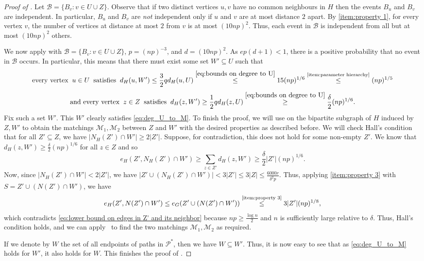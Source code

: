 \documentclass[10pt,a4paper,reqno]{amsart}
\begin{document}
\begin{proof}[Proof of ]
Let $\mathcal{B} = \{B_v : v \in U \cup Z\}$. Observe that if two distinct vertices $u,v$ have no common neighbours in $H$ then the events $B_u$ and $B_v$ are independent. In particular, $B_u$ and $B_v$ are \emph{not} independent only if $u$ and $v$ are at most distance $2$ apart. By \ref{item:property 1}, for every vertex $v$, the number of vertices at distance at most $2$ from $v$ is at most $(10np)^2$. Thus, each event in $\mathcal{B}$ is independent from all but at most $(10np)^2$ others. 

We now apply  with $\mathcal{B} = \{B_v : v \in U \cup Z\}$, $p = (np)^{-3}$, and $d = \left(10np\right)^2$. As $ep(d+1)<1$, there is a positive probability that no event in $\mathcal{B}$ occurs. In particular, this means that there must exist some set $W' \subseteq U$ such that 
\[
\text{every vertex} \;\; u \in U \;\; \text{satisfies} \;\; d_H(u,W') \le \frac{3}{2} q d_H(u,U) \overset{\eqref{eq:bounds on degree to U}}{\le} 15(np)^{1/6} \overset{\text{\ref{item:parameter hierarchy}}}{\le} (np)^{1/5}
\]
\[
\text{and every vertex} \;\; z \in Z \;\; \text{satisfies} \;\; d_H(z,W') \ge \frac{1}{2} q d_H(z,U) \overset{\eqref{eq:bounds on degree to U}}{\ge} \frac{\delta}{2}(np)^{1/6}.
\]
Fix such a set $W'$. This $W'$ clearly satisfies \ref{eq:deg_U_to_M}. To finish the proof, we will use  on the bipartite subgraph of $H$ induced by $Z,W'$ to obtain the matchings $\mathcal{M}_1, \mathcal{M}_2$ between $Z$ and $W'$ with the desired properties as described before. 
We will check Hall's condition that for all $Z' \subseteq Z$, we have $|N_H(Z') \cap W'| \ge 2|Z'|$. Suppose, for contradiction, this does not hold for some non-empty $Z'$. We know that $d_H(z,W') \ge \frac{\delta}{2}(np)^{1/6}$ for all $z \in Z$ and so
\begin{equation}\label{eq:lower bound on edges in Z' and its neighbor}
e_H(Z',N_H(Z')\cap W') \ge \sum_{z \in Z'} d_H(z,W') \ge \frac{\delta}{2}|Z'|(np)^{1/6}.
\end{equation}
Now, since $|N_H(Z') \cap W'| < 2|Z'|$, we have 
$|Z' \cup \left(N_H(Z') \cap W'\right)| < 3|Z'| \le 3|Z| \le \frac{6000r}{\delta^2 p}$. 
Thus, applying \ref{item:property 3} with $S=Z' \cup \left(N(Z') \cap W'\right)$, we have 
\[
e_H(Z',N(Z')\cap W') \le e_G(Z' \cup \left(N(Z') \cap W'\right)) \overset{\text{\ref{item:property 3}}}{\le} 3|Z'|(np)^{1/8},
\]
which contradicts \eqref{eq:lower bound on edges in Z' and its neighbor} because $np\ge \frac{\log{n}}{2}$ and $n$ is sufficiently large relative to $\delta$. Thus, Hall's condition holds, and we can apply~ to find the two matchings $\mathcal{M}_1, \mathcal{M}_2$ as required. 

If we denote by $W$ the set of all endpoints of paths in $\mathcal{P}^*$, then we have $W\subseteq W'$. Thus, it is now easy to see that as \ref{eq:deg_U_to_M} holds for $W'$, it also holds for $W$. This finishes the proof of .
\end{proof}
\end{document}
